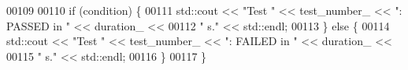 \begin{DoxyCode}
00109 
00110   \textcolor{keywordflow}{if} (condition) \{
00111     std::cout << \textcolor{stringliteral}{"Test "} << test\_number\_ << \textcolor{stringliteral}{": PASSED in "} << duration\_ <<
00112       \textcolor{stringliteral}{" s."} << std::endl;
00113   \} \textcolor{keywordflow}{else} \{
00114     std::cout << \textcolor{stringliteral}{"Test "} << test\_number\_ << \textcolor{stringliteral}{": FAILED in "} << duration\_ <<
00115       \textcolor{stringliteral}{" s."} << std::endl;
00116   \}
00117 \}
\end{DoxyCode}
